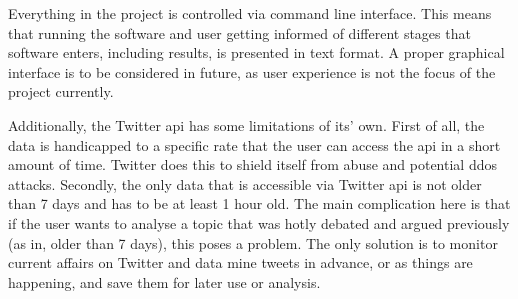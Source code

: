         Everything in the project is controlled via command line interface. This means that running the software and user getting informed of different stages that software enters, including results, is presented in text format. A proper graphical interface is to be considered in future, as user experience is not the focus of the project currently.
        
        Additionally, the Twitter \gls{api} has some limitations of its' own. First of all, the data is handicapped to a specific rate that the user can access the \gls{api} in a short amount of time. Twitter does this to shield itself from abuse and potential \gls{ddos} attacks. Secondly, the only data that is accessible via Twitter \gls{api} is not older than 7 days and has to be at least 1 hour old. The main complication here is that if the user wants to analyse a topic that was hotly debated and argued previously (as in, older than 7 days), this poses a problem. The only solution is to monitor current affairs on Twitter and data mine tweets in advance, or as things are happening, and save them for later use or analysis.